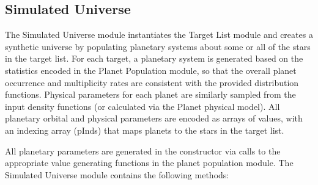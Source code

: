 \documentclass[cleanfoot]{asme2ej}
\newcommand{\reffig}[1]{Figure \ref{#1}}
\begin{document}
\subsection{Simulated Universe} \label{sec:simulateduniverse}
The Simulated Universe module instantiates the Target List module and creates a synthetic universe by populating planetary systems about some or all of the stars in the target list.  For each target, a planetary system is generated based on the statistics encoded in the Planet Population module, so that the overall planet occurrence and multiplicity rates are consistent with the provided distribution functions.  Physical parameters for each planet are similarly sampled from the input density functions (or calculated via the Planet physical model).  All planetary orbital and physical parameters are encoded as arrays of values, with an indexing array (pInds) that maps planets to the stars in the target list. 

All planetary parameters are generated in the constructor via calls to the appropriate value generating functions in the planet population module.%
The Simulated Universe module contains the following methods: 
\end{document}
